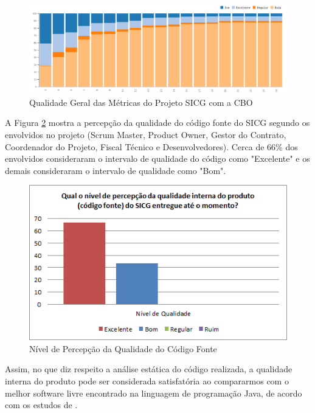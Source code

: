 \begin{figure}[H]
		\centering
			\includegraphics[scale=0.5]{figuras/todasmetricasComCOB.png}
		\caption{Qualidade Geral das Métricas do Projeto SICG com a CBO}
		\label{qualidadesprint2}
\end{figure}



\textcolor{red}{}



A Figura \ref{percepcaoqualidade} mostra a percepção da qualidade do código fonte do SICG segundo os envolvidos no projeto (Scrum Master, Product Owner, Gestor do Contrato, Coordenador do Projeto, Fiscal Técnico e Desenvolvedores). Cerca de 66\% dos envolvidos consideraram  o intervalo de qualidade do código como "Excelente" e os demais consideraram
o intervalo de qualidade como "Bom".

\begin{figure}[H]
		\centering
			\includegraphics[scale=1.0]{figuras/percepcaoqualidade.png}
		\caption{Nível de Percepção da Qualidade do Código Fonte}
		\label{percepcaoqualidade}
\end{figure}

Assim, no que diz respeito a análise estática do código realizada, a qualidade interna do produto pode ser considerada satisfatória ao compararmos com o melhor software livre encontrado na linguagem de programação Java, de acordo com os estudos de . 

